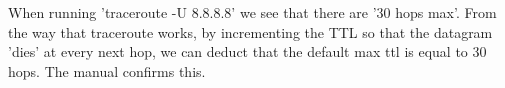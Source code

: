 When running 'traceroute -U 8.8.8.8' we see that there are '30 hops max'. From the way that traceroute works, by incrementing the TTL so that the datagram 'dies' at every next hop, we can deduct that the default max ttl is equal to 30 hops. The manual confirms this.